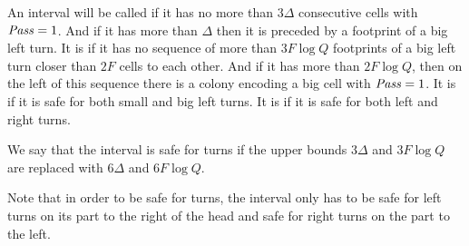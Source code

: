 \documentclass[11pt]{memoir}
\theoremstyle{definition} %
\newcommand{\fld}[1]{\ensuremath{\textit{#1\/}}}
\newcommand{\F}{F}
\newcommand{\Q}{Q} %
\newcommand{\Pass}{\fld{Pass}} %
\begin{document}
\begin{definition}\label{def:safe-for-turns}
  An interval will be called 
  if it has no more than \( 3\Delta \) consecutive cells with \( \Pass=1 \).
  And if it has more than \( \Delta \) then it is preceded by a footprint of a big left turn.
  It is  if it has no sequence of more than \( 3\F\log\Q \)
  footprints of a big left turn closer than \( 2\F \) cells to each other.
  And if it has more than \( 2\F\log\Q \), then on the left of this sequence there is a
  colony encoding a big cell with \( \Pass=1 \).
  It is  if it is safe for both small and big left turns.
  It is  if it is safe for both left and right turns.

  We say that the interval is  safe for turns if the upper bounds \( 3\Delta \) and
  \( 3\F\log\Q \) are replaced with \( 6\Delta \) and \( 6\F\log\Q \).
\end{definition}

Note that in order to be safe for turns, the interval only has to be safe for left turns on
its part to the right of the head and safe for right turns on the part to the left.
\end{document}

